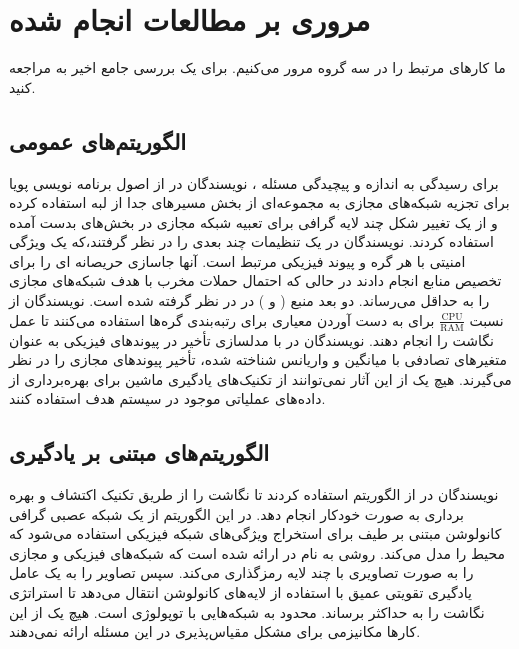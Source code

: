 \chapter{مروری بر مطالعات انجام شده}
ما کارهای مرتبط را در سه گروه مرور می‌کنیم. برای یک بررسی جامع اخیر به
 \cite {survey_1} 
 مراجعه کنید.
 
 \section{
الگوریتم‌های عمومی  
}
برای رسیدگی به اندازه و پیچیدگی مسئله ، نویسندگان در 
\cite {Kibalya_2020_CN}
 از اصول برنامه نویسی پویا برای تجزیه شبکه‌های مجازی به مجموعه‌ای از بخش‌ مسیرهای جدا از لبه 
 استفاده کرده و از یک تغییر شکل چند لایه گرافی برای تعبیه شبکه مجازی در بخش‌های بدست آمده استفاده کردند. 
نویسندگان در
 \cite {Cao_2020_WCNCW} 
 یک تنظیمات چند بعدی را در نظر گرفتند،که یک ویژگی امنیتی با هر گره و پیوند فیزیکی مرتبط است. آنها جاسازی حریصانه ای را برای تخصیص منابع انجام دادند در حالی که احتمال حملات مخرب با هدف شبکه‌های مجازی را به حداقل می‌رساند.
 دو بعد منبع (
  و 
 )
 در 
 \cite {Pentelas_2020_NOMS} 
 در نظر گرفته شده است. نویسندگان از نسبت
 $\frac{\text{CPU}}{\text{RAM}}$
 برای به دست آوردن معیاری برای رتبه‌بندی گره‌ها استفاده می‌کنند تا عمل نگاشت را انجام دهند. 
 نویسندگان در
  \cite {Hosseini_2019_TNSM} 
  با مدلسازی تأخیر در پیوندهای فیزیکی به عنوان متغیرهای تصادفی با میانگین و واریانس شناخته شده، تأخیر پیوندهای مجازی را در نظر می‌گیرند.
  هیچ یک از این آثار نمی‌توانند از تکنیک‌های یادگیری ماشین برای بهره‌برداری از داده‌های عملیاتی موجود در سیستم هدف استفاده کنند.
  
\section{
الگوریتم‌های  مبتنی بر یادگیری
}
 
 نویسندگان در 
 \cite {graphNN_RL}
  از الگوریتم 
   استفاده کردند تا نگاشت را از طریق تکنیک اکتشاف و بهره برداری به صورت خودکار انجام دهد. در این الگوریتم از یک شبکه عصبی گرافی کانولوشن مبتنی بر طیف برای استخراج ویژگی‌های شبکه فیزیکی استفاده می‌شود که محیط را مدل می‌کند.
   روشی به نام  در 
   \cite {Dolati_2019_Infocom} 
   ارائه شده است که شبکه‌‌های فیزیکی و مجازی را به صورت تصاویری با چند لایه رمزگذاری می‌کند. سپس تصاویر را به یک عامل یادگیری تقویتی عمیق
    با استفاده از لایه‌های کانولوشن انتقال می‌دهد تا استراتژی نگاشت را به حداکثر برساند.  محدود به شبکه‌هایی با توپولوژی  است.
    هیچ یک از این کارها مکانیزمی‌ برای مشکل مقیاس‌پذیری در این مسئله ارائه نمی‌دهند.
    
